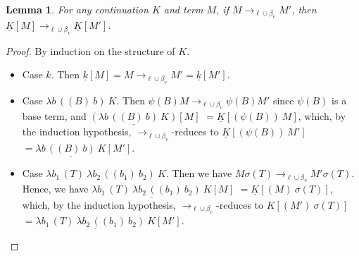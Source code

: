 \documentclass{LMCS}
\newtheorem{lemma}[theorem]{Lemma}
\newcommand{\xto}[1]{\ensuremath{\rightarrow_{#1}}}
\newcommand{\toblinred}{\xto{\ell\cup\beta_v}}
\begin{document}
\begin{lemma}\label{lem:continuation-step}
  For any continuation $K$ and term
  $M$, if $M\toblinred M'$, then $\underline{K}[M]\toblinred\underline{K}[M']$.
\end{lemma}
\begin{proof}
  By induction on the structure of $K$.
  \begin{itemize}
    \item Case $k$. Then $\underline{k}[M]=M\toblinred M'=\underline{k}[M']$.
    \item Case $\lambda b\,((B)~b)~K$. Then $\psi(B)M\toblinred\psi(B)M'$ since $\psi(B)$
      is a base term, and 
      $\underline{(\lambda b\,((B)~b)~K)}[M]$
      $=\underline{K}[(\psi(B))~M]$,
      which, by the induction hypothesis, \toblinred-reduces to
      $\underline{K}[(\psi(B))~M']$
      $=\underline{\lambda b\,((B)~b)~K}[M']$.

    \item Case $\lambda b_1\,(T)~\lambda b_2\,((b_{1})~b_{2})~K$. Then we have
      $M\sigma(T)\toblinred M'\sigma(T)$. Hence, we have
      $\underline{\lambda b_1\,(T)~\lambda b_2\,((b_{1})~b_{2})~K}[M]$
      $=\underline{K}[(M)~\sigma(T)]$,
      which, by the induction hypothesis, \toblinred-reduces to
      $K[(M')~\sigma(T)]$
      $=\underline{\lambda b_1\,(T)~\lambda b_2\,((b_{1})~b_{2})~K}[M']$.
      \qedhere
  \end{itemize}
\end{proof}
\end{document}
